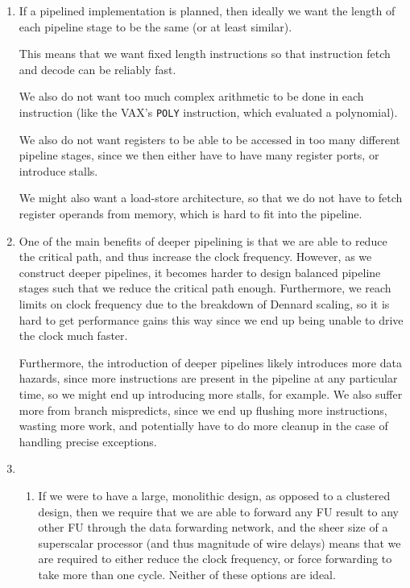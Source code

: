 


\begin{enumerate}[label=(\alph*)]
  \item
    If a pipelined implementation is planned, then ideally we want the length of each pipeline stage to be the same (or at least similar). 

    This means that we want fixed length instructions so that instruction fetch and decode can be reliably fast.

    We also do not want too much complex arithmetic to be done in each instruction (like the VAX's \texttt{POLY} instruction, which evaluated a polynomial).

    We also do not want registers to be able to be accessed in too many different pipeline stages, since we then either have to have many register ports, or introduce stalls.

    We might also want a load-store architecture, so that we do not have to fetch register operands from memory, which is hard to fit into the pipeline.

  \item
    One of the main benefits of deeper pipelining is that we are able to reduce the critical path, and thus increase the clock frequency. However, as we construct deeper pipelines, it becomes harder to design balanced pipeline stages such that we reduce the critical path enough. Furthermore, we reach limits on clock frequency due to the breakdown of Dennard scaling, so it is hard to get performance gains this way since we end up being unable to drive the clock much faster.

    Furthermore, the introduction of deeper pipelines likely introduces more data hazards, since more instructions are present in the pipeline at any particular time, so we might end up introducing more stalls, for example. We also suffer more from branch mispredicts, since we end up flushing more instructions, wasting more work, and potentially have to do more cleanup in the case of handling precise exceptions.

  \item
    \begin{enumerate}[label=(\roman*)]
      \item

        If we were to have a large, monolithic design, as opposed to a clustered design, then we require that we are able to forward any FU result to any other FU through the data forwarding network, and the sheer size of a superscalar processor (and thus magnitude of wire delays) means that we are required to either reduce the clock frequency, or force forwarding to take more than one cycle. Neither of these options are ideal.


\end{enumerate}
\end{enumerate}
